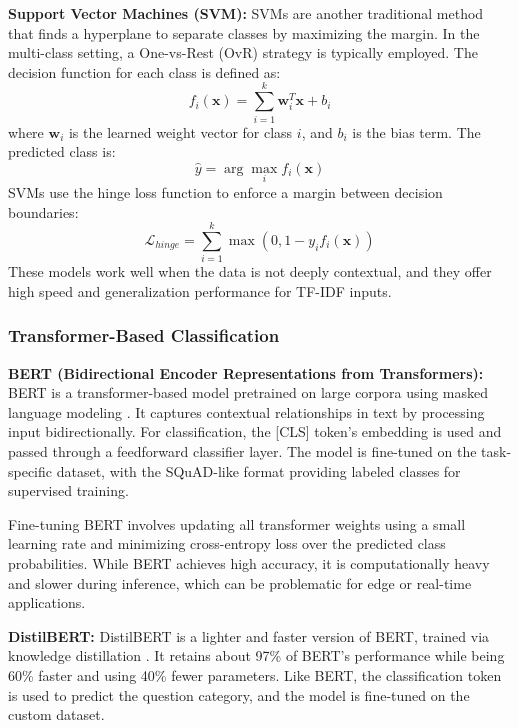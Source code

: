 \documentclass[conference]{IEEEtran}
\begin{document}
\textbf{Support Vector Machines (SVM):}
SVMs are another traditional method that finds a hyperplane to separate classes by maximizing the margin. 
In the multi-class setting, a One-vs-Rest (OvR) strategy is typically employed. 
The decision function for each class is defined as:
\begin{equation}
    f_i(\mathbf{x}) = \sum_{i=1}^{k} \mathbf{w}^T_i \mathbf{x} + b_i
\end{equation}
where $\mathbf{w}_i$ is the learned weight vector for class $i$, and $b_i$ is the bias term.
The predicted class is:
\begin{equation}
    \hat{y} = \arg\max_{i} f_i(\mathbf{x})
\end{equation}
SVMs use the hinge loss function to enforce a margin between decision boundaries:
\begin{equation}
    \mathcal{L}_{hinge} = \sum_{i=1}^{k} \max(0, 1 - y_i f_i(\mathbf{x}))
\end{equation}
These models work well when the data is not deeply contextual, and they offer high speed and generalization performance for TF-IDF inputs.

\subsubsection{Transformer-Based Classification}
\textbf{BERT (Bidirectional Encoder Representations from Transformers):}
BERT is a transformer-based model pretrained on large corpora using masked language modeling \cite{b12}. 
It captures contextual relationships in text by processing input bidirectionally. 
For classification, the [CLS] token's embedding is used and passed through a feedforward classifier layer. 
The model is fine-tuned on the task-specific dataset, with the SQuAD-like format providing labeled classes for supervised training.

Fine-tuning BERT involves updating all transformer weights using a small learning rate and minimizing cross-entropy loss over the predicted class probabilities. 
While BERT achieves high accuracy, it is computationally heavy and slower during inference, which can be problematic for edge or real-time applications.

\textbf{DistilBERT:}
DistilBERT is a lighter and faster version of BERT, trained via knowledge distillation \cite{b13}. 
It retains about 97\% of BERT's performance while being 60\% faster and using 40\% fewer parameters. 
Like BERT, the classification token is used to predict the question category, and the model is fine-tuned on the custom dataset.
\end{document}

